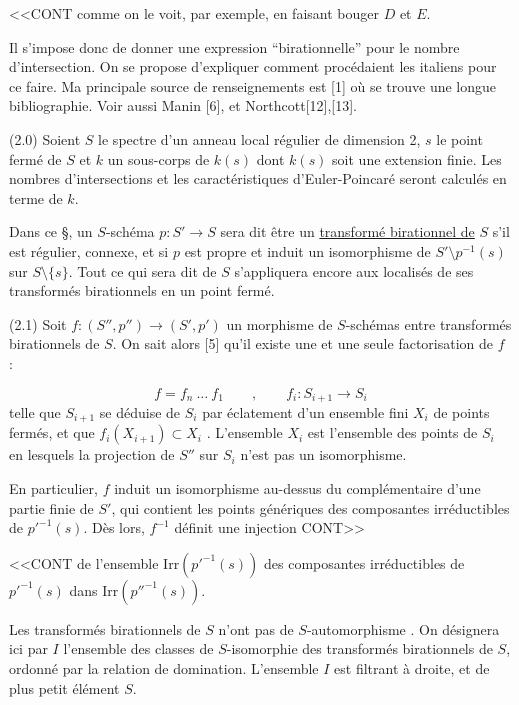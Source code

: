 
<<CONT comme on le voit, par exemple, en faisant bouger $D$ et $E$.

Il s'impose donc de donner une expression ``birationnelle'' pour le nombre d'intersection. On se propose d'expliquer comment procédaient les italiens pour ce faire. Ma principale source de renseignements est [1] où se trouve une longue bibliographie. Voir aussi Manin [6], et Northcott[12],[13].

(2.0) Soient $S$ le spectre d'un anneau local régulier de dimension 2, $s$ le point fermé de $S$ et $k$ un sous-corps de $k(s)$ dont $k(s)$ soit une extension finie. Les nombres d'intersections et les caractéristiques d'Euler-Poincaré seront calculés en terme de $k$.

Dans ce \S, un $S$-schéma $p : S' \longrightarrow S$ sera dit être un \underline{transformé birationnel de} $S$ s'il est régulier, connexe, et si $p$ est propre et induit un isomorphisme de $S' \setminus p^{-1}(s)$ sur $S \setminus \{s\}$. Tout ce qui sera dit de $S$ s'appliquera encore aux localisés de ses transformés birationnels en un point fermé.

(2.1) Soit $f : (S'',p'') \longrightarrow (S',p')$ un morphisme de $S$-schémas entre transformés birationnels de $S$. On sait alors [5] qu'il existe une et une seule factorisation de $f$ :

\begin{equation*}
f = f_n \ \ldots \ f_1 \qquad , \qquad f_i : S_{i+1} \longrightarrow S_i
\end{equation*}
telle que $S_{i+1}$ se déduise de $S_i$ par éclatement d'un ensemble fini $X_i$ de points fermés, et que $f_i(X_{i+1}) \subset X_i$ . L'ensemble $X_i$ est l'ensemble des points de $S_i$ en lesquels la projection de $S''$ sur $S_i$ n'est pas un isomorphisme.

En particulier, $f$ induit un isomorphisme au-dessus du complémentaire d'une partie finie de $S'$, qui contient les points génériques des composantes irréductibles de $p'^{-1}(s)$. Dès lors, $f^{-1}$ définit une injection CONT>>



<<CONT de l'ensemble $\mathrm{Irr}({p'}^{-1}(s))$ des composantes irréductibles de ${p'}^{-1}(s)$ dans $\mathrm{Irr}({p''}^{-1}(s))$.

Les transformés birationnels de $S$ n'ont pas de $S$-automorphisme . On désignera ici par $I$ l'ensemble des classes de $S$-isomorphie des transformés birationnels de $S$, ordonné par la relation de domination. L'ensemble $I$ est filtrant à droite, et de plus petit élément $S$.

